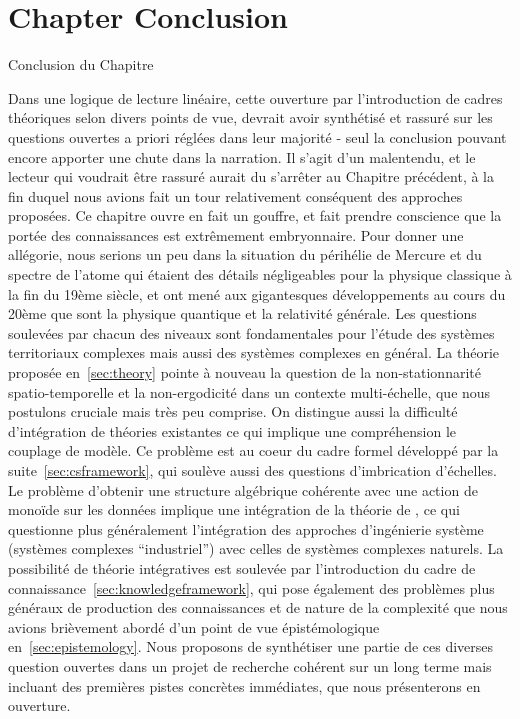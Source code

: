 



\newpage


\section*{Chapter Conclusion}{Conclusion du Chapitre}


Dans une logique de lecture linéaire, cette ouverture par l'introduction de cadres théoriques selon divers points de vue, devrait avoir synthétisé et rassuré sur les questions ouvertes a priori réglées dans leur majorité - seul la conclusion pouvant encore apporter une chute dans la narration. Il s'agit d'un malentendu, et le lecteur qui voudrait être rassuré aurait du s'arrêter au Chapitre précédent, à la fin duquel nous avions fait un tour relativement conséquent des approches proposées. Ce chapitre ouvre en fait un gouffre, et fait prendre conscience que la portée des connaissances est extrêmement embryonnaire. Pour donner une allégorie, nous serions un peu dans la situation du périhélie de Mercure et du spectre de l'atome qui étaient des détails négligeables pour la physique classique à la fin du 19ème siècle, et ont mené aux gigantesques développements au cours du 20ème que sont la physique quantique et la relativité générale. Les questions soulevées par chacun des niveaux sont fondamentales pour l'étude des systèmes territoriaux complexes mais aussi des systèmes complexes en général. La théorie proposée en~\ref{sec:theory} pointe à nouveau la question de la non-stationnarité spatio-temporelle et la non-ergodicité dans un contexte multi-échelle, que nous postulons cruciale mais très peu comprise. On distingue aussi la difficulté d'intégration de théories existantes ce qui implique une compréhension le couplage de modèle. Ce problème est au coeur du cadre formel développé par la suite~\ref{sec:csframework}, qui soulève aussi des questions d'imbrication d'échelles. Le problème d'obtenir une structure algébrique cohérente avec une action de monoïde sur les données implique une intégration de la théorie de , ce qui questionne plus généralement l'intégration des approches d'ingénierie système (systèmes complexes ``industriel'') avec celles de systèmes complexes naturels. La possibilité de théorie intégratives est soulevée par l'introduction du cadre de connaissance~\ref{sec:knowledgeframework}, qui pose également des problèmes plus généraux de production des connaissances et de nature de la complexité que nous avions brièvement abordé d'un point de vue épistémologique en~\ref{sec:epistemology}. Nous proposons de synthétiser une partie de ces diverses question ouvertes dans un projet de recherche cohérent sur un long terme mais incluant des premières pistes concrètes immédiates, que nous présenterons en ouverture.




\stars
